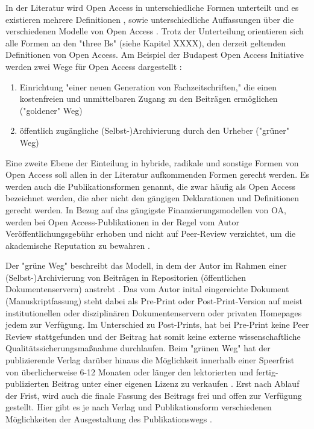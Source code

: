 In der Literatur wird Open Access in unterschiedliche Formen unterteilt und es existieren mehrere Definitionen \cite{CREATe_2014} \cite{albert_2006_open_implications}, sowie unterschiedliche Auffassungen über die verschiedenen Modelle von Open Access \cite{CREATe_2014} \cite{cite:22b} \cite{lewis_2012_inevitability}. Trotz der Unterteilung orientieren sich alle Formen an den "three Bs" (siehe Kapitel XXXX), den derzeit geltenden Definitionen von Open Access. Am Beispiel der Budapest Open Access Initiative werden zwei Wege für Open Access dargestellt \cite{albert_2006_open_implications}: 
\begin{enumerate}
\item Einrichtung "einer neuen Generation von Fachzeitschriften," die einen kostenfreien und unmittelbaren Zugang zu den Beiträgen ermöglichen ("goldener" Weg)
\item öffentlich zugängliche (Selbst-)Archivierung durch den Urheber ("grüner" Weg)
\end{enumerate}

Eine zweite Ebene der Einteilung in hybride, radikale und sonstige Formen von Open Access soll allen in der Literatur aufkommenden Formen gerecht werden. Es werden auch die Publikationsformen genannt, die zwar häufig als Open Access bezeichnet werden, die aber nicht den gängigen Deklarationen \cite{boai_2012} und Definitionen gerecht werden. In Bezug auf das gängigste Finanzierungsmodellen von OA, werden bei Open Access-Publikationen in der Regel vom Autor Veröffentlichungsgebühr erhoben und nicht auf Peer-Review verzichtet, um die akademische Reputation zu bewahren \cite{albert_2006_open_implications} \cite{Open_Access_net_2009}.

Der "grüne Weg" beschreibt das Modell, in dem der Autor im Rahmen einer (Selbst-)Archivierung von Beiträgen in Repositorien (öffentlichen Dokumentenservern) anstrebt \cite{suchen}. Das vom Autor inital eingereichte Dokument (Manuskriptfassung) steht dabei als Pre-Print oder Post-Print-Version auf meist institutionellen oder disziplinären Dokumentenservern \cite{suchen} oder privaten Homepages \cite{suchen} jedem zur Verfügung. Im Unterschied zu Post-Prints, hat bei Pre-Print keine Peer Review stattgefunden \cite{suchen} und der Beitrag hat somit keine externe wissenschaftliche Qualitätssicherungsmaßnahme durchlaufen. Beim "grünen Weg" hat der publizierende Verlag darüber hinaus die Möglichkeit innerhalb einer Speerfrist von überlicherweise 6-12 Monaten \cite{suchen} oder länger den lektorierten und fertig-publizierten Beitrag unter einer eigenen Lizenz zu verkaufen \cite{suchen}. Erst nach Ablauf der Frist, wird auch die finale Fassung des Beitrags frei und offen zur Verfügung gestellt. Hier gibt es je nach Verlag und Publikationsform verschiedenen Möglichkeiten der Ausgestaltung des Publikationswegs \cite{suchen}.

